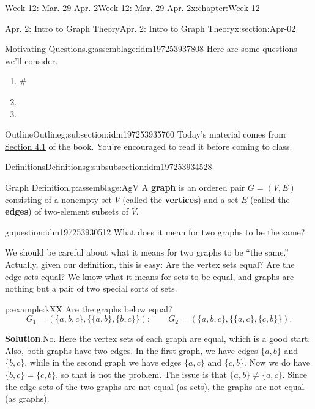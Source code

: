 \documentclass[oneside,10pt,]{book}
\newcommand{\blocktitlefont}{\relax}
\newcommand{\terminology}[1]{\textbf{#1}}
\numberwithin{equation}{section}
\begin{document}
\begin{chapterptx}{Week 12: Mar. 29-Apr. 2}{}{Week 12: Mar. 29-Apr. 2}{}{}{x:chapter:Week-12}
\begin{sectionptx}{Apr. 2: Intro to Graph Theory}{}{Apr. 2: Intro to Graph Theory}{}{}{x:section:Apr-02}
\begin{introduction}{}
\begin{assemblage}{Motivating Questions.}{g:assemblage:idm197253937808}
Here are some questions we'll consider. %
\begin{enumerate}
\item{}\#%
\item{}%
\item{}%
\end{enumerate}
%
\end{assemblage}
\end{introduction}%
%
%
\typeout{************************************************}
\typeout{************************************************}
%
\begin{subsectionptx}{Outline}{}{Outline}{}{}{g:subsection:idm197253935760}
Today's material comes from \href{http://discrete.openmathbooks.org/dmoi3/sec_gt-intro.html}{Section 4.1} of the book. You're encouraged to read it before coming to class.%
%
%
\typeout{************************************************}
\typeout{************************************************}
%
\begin{subsubsectionptx}{Definitions}{}{Definitions}{}{}{g:subsubsection:idm197253934528}
\begin{assemblage}{Graph Definition.}{p:assemblage:AgV}%
A \terminology{graph} is an ordered pair \(G = (V, E)\) consisting of a nonempty set \(V\) (called the \terminology{vertices}) and a set \(E\) (called the \terminology{edges}) of two-element subsets of \(V\).%
\end{assemblage}
\begin{question}{}{g:question:idm197253930512}%
What does it mean for two graphs to be the same?%
\end{question}
We should be careful about what it means for two graphs to be ``the same.'' Actually, given our definition, this is easy: Are the vertex sets equal? Are the edge sets equal? We know what it means for sets to be equal, and graphs are nothing but a pair of two special sorts of sets.%
\begin{example}{}{p:example:kXX}%
Are the graphs below equal?%
\begin{equation*}
G_1 = (\{a,b,c\}, \{\{a,b\}, \{b,c\}\}); \qquad G_2 = (\{a,b,c\}, \{\{a,c\}, \{c, b\}\})\text{.}
\end{equation*}
%
\par\smallskip%
\noindent\textbf{\blocktitlefont Solution}.\hypertarget{p:solution:XEm}{}\quad{}No. Here the vertex sets of each graph are equal, which is a good start. Also, both graphs have two edges. In the first graph, we have edges \(\{a,b\}\) and \(\{b,c\}\), while in the second graph we have edges	\(\{a,c\}\) and 	\(\{c,b\}\). Now we do have \(\{b,c\} = \{c,b\}\), so that is not the problem. The issue is that \(\{a,b\} \ne \{a,c\}\). Since the edge sets of the two graphs are not equal (as sets), the graphs are not equal (as graphs).%

\end{example}
\end{subsubsectionptx}
\end{subsectionptx}
\end{sectionptx}
\end{chapterptx}
\end{document}
